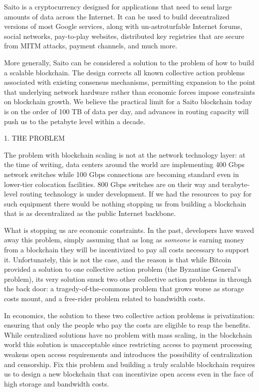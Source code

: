 \documentclass[11.5pt, oneside]{article}   	%
\begin{document}
\begin{multicols}{2}
Saito is a cryptocurrency designed for applications that need to send large amounts of data across the Internet. It can be used to build decentralized versions of most Google services, along with un-astroturfable Internet forums, social networks, pay-to-play websites, distributed key registries that are secure from MITM attacks, payment channels, and much more.

More generally, Saito can be considered a solution to the problem of how to build a scalable blockchain. The design corrects all known collective action problems associated with existing consensus mechanisms, permitting expansion to the point that underlying network hardware rather than economic forces impose constraints on blockchain growth. We believe the practical limit for a Saito blockchain today is on the order of 100 TB of data per day, and advances in routing capacity will push us to the petabyte level within a decade.


1. THE PROBLEM

The problem with blockchain scaling is not at the network technology layer: at the time of writing, data centers around the world are implementing 400 Gbps network switches while 100 Gbps connections are becoming standard even in lower-tier colocation facilities. 800 Gbps switches are on their way and terabyte-level routing technology is under development. If we had the resources to pay for such equipment there would be nothing stopping us from building a blockchain that is as decentralized as the public Internet backbone.

What is stopping us are economic constraints. In the past, developers have waved away this problem, simply assuming that as long as {\textit{someone}} is earning money from a blockchain they will be incentivized to pay all costs necessary to support it. Unfortunately, this is not the case, and the reason is that while Bitcoin provided a solution to one collective action problem (the Byzantine General's problem), its very solution snuck two other collective action problems in through the back door: a tragedy-of-the-commons problem that grows worse as storage costs mount, and a free-rider problem related to bandwidth costs.

In economics, the solution to these two collective action problems is privatization: ensuring that only the people who pay the costs are eligible to reap the benefits. While centralized solutions have no problem with mass scaling, in the blockchain world this solution is unacceptable since restricting access to payment processing weakens open access requirements and introduces the possibility of centralization and censorship. Fix this problem and building a truly scalable blockchain requires us to design a new blockchain that can incentivize open access even in the face of high storage and bandwidth costs.


\end{multicols}
\end{document}
